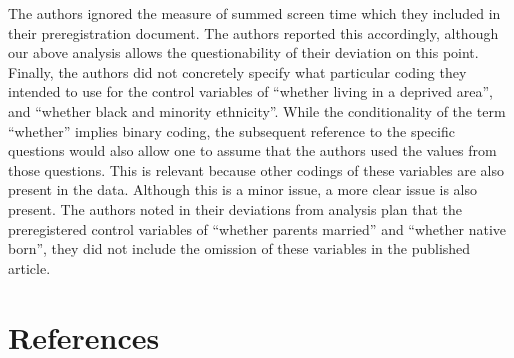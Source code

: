 \documentclass[floatsintext,man]{apa6}
\theoremstyle{definition}
\theoremstyle{definition}
\theoremstyle{definition}
\theoremstyle{remark}
\begin{document}
The authors ignored the measure of summed screen time which they
included in their preregistration document. The authors reported this
accordingly, although our above analysis allows the questionability of
their deviation on this point. Finally, the authors did not concretely
specify what particular coding they intended to use for the control
variables of \enquote{whether living in a deprived area}, and
\enquote{whether black and minority ethnicity}. While the conditionality
of the term \enquote{whether} implies binary coding, the subsequent
reference to the specific questions would also allow one to assume that
the authors used the values from those questions. This is relevant
because other codings of these variables are also present in the data.
Although this is a minor issue, a more clear issue is also present. The
authors noted in their deviations from analysis plan that the
preregistered control variables of \enquote{whether parents married} and
\enquote{whether native born}, they did not include the omission of
these variables in the published article.

\newpage

\hypertarget{references}{%
\section{References}\label{references}}

\begingroup
\setlength{\parindent}{-0.5in}
\setlength{\leftskip}{0.5in}

\hypertarget{refs}{}

\endgroup


\clearpage
\renewcommand{\listtablename}{Table captions}
\listoftables
\end{document}
